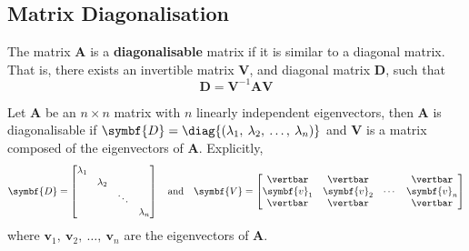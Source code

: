 \documentclass{article}
\begin{document}
\subsection{Matrix Diagonalisation}
\begin{definition}
    The matrix \(\symbf{A}\) is a \textbf{diagonalisable} matrix if it
    is similar to a diagonal matrix. That is, there exists an invertible
    matrix \(\symbf{V}\), and diagonal matrix \(\symbf{D}\),
    such that
    \begin{equation*}
        \symbf{D}=\symbf{V}^{-1}\symbf{A}\symbf{V}
    \end{equation*}
\end{definition}
\begin{theorem}
    Let \(\symbf{A}\) be an \(n \times n\) matrix with \(n\) linearly
    independent eigenvectors, then \(\symbf{A}\) is diagonalisable if
    \(\symbf{D}=\diag{\left( \lambda_1,\: \lambda_2,\: \dots,\: \lambda_n \right)}\)
    and \(\symbf{V}\) is a matrix composed of the eigenvectors of
    \(\symbf{A}\). Explicitly,
    \begin{equation*}
        \symbf{D} =
        \begin{bmatrix}
            \lambda_1 &           &        &           \\
                      & \lambda_2 &        &           \\
                      &           & \ddots &           \\
                      &           &        & \lambda_n
        \end{bmatrix}
        \quad
        \text{and}\quad
        \symbf{V} =
        \begin{bmatrix}
            \vertbar    & \vertbar    &        & \vertbar    \\
            \symbf{v}_1 & \symbf{v}_2 & \cdots & \symbf{v}_n \\
            \vertbar    & \vertbar    &        & \vertbar
        \end{bmatrix}
    \end{equation*}
    where \(\symbf{v}_1,\: \symbf{v}_2,\: \dots,\: \symbf{v}_n\)
    are the eigenvectors of \(\symbf{A}\).
\end{theorem}
\end{document}
